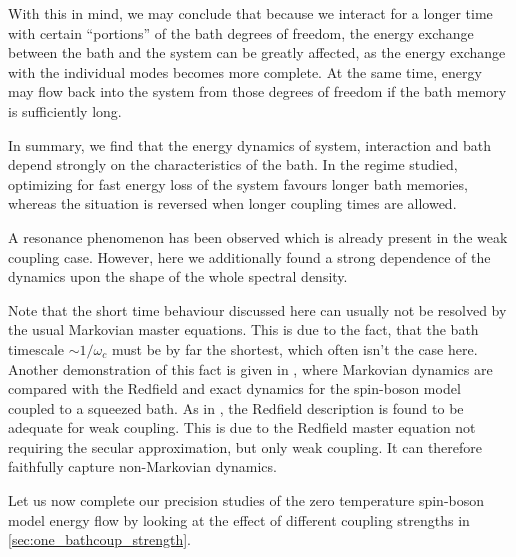With this in mind, we may conclude that because we interact for a
longer time with certain ``portions'' of the bath degrees of freedom,
the energy exchange between the bath and the system can be greatly
affected, as the energy exchange with the individual modes becomes
more complete.  At the same time, energy may flow back into the system
from those degrees of freedom if the bath memory is sufficiently
long.

In summary, we find that the energy dynamics of system, interaction
and bath depend strongly on the characteristics of the bath.  In the
regime studied, optimizing for fast energy loss of the system favours
longer bath memories, whereas the situation is reversed when longer
coupling times are allowed.

A resonance phenomenon has been observed which is already present in
the weak coupling case. However, here we additionally found a strong
dependence of the dynamics upon the shape of the whole spectral
density.

Note that the short time behaviour discussed here can usually not be
resolved by the usual Markovian master equations. This is due to the
fact, that the bath timescale \(\sim 1/ω_{c}\) must be by far the
shortest, which often isn't the case here. Another demonstration of
this fact is given in , where Markovian dynamics are
compared with the Redfield and exact dynamics for the spin-boson model
coupled to a squeezed bath. As in , the Redfield
description is found to be adequate for weak coupling. This is due to
the Redfield master equation not requiring the secular approximation,
but only weak coupling. It can therefore faithfully capture
non-Markovian dynamics.

Let us now complete our precision studies of the zero temperature
spin-boson model energy flow by looking at the effect of different
coupling strengths in \cref{sec:one_bathcoup_strength}.

